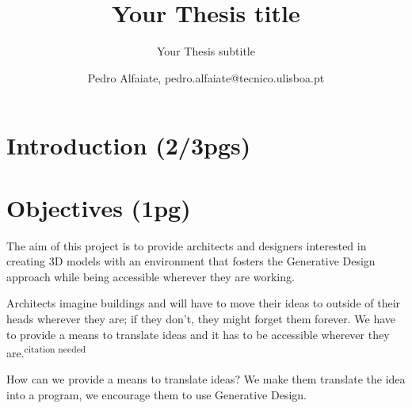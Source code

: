 \documentclass{./llncs2e/llncs}
\begin{document}
\title{Your Thesis title}

\subtitle{Your Thesis subtitle}
\author{Pedro Alfaiate, pedro.alfaiate@tecnico.ulisboa.pt}

\maketitle

\begin{abstract}

\end{abstract}
\begin{keywords}

\end{keywords}
\section{Introduction (2/3pgs)}

\section{Objectives (1pg)}
The aim of this project is to provide architects and designers interested in creating 3D models with an environment that fosters the Generative Design approach while being accessible wherever they are working.

Architects imagine buildings and will have to move their ideas to outside of their heads wherever they are; if they don't, they might forget them forever. We have to provide a means to translate ideas and it has to be accessible wherever they are.\textsuperscript{citation needed}

How can we provide a means to translate ideas? We make them translate the idea into a program, we encourage them to use Generative Design.
\end{document}

